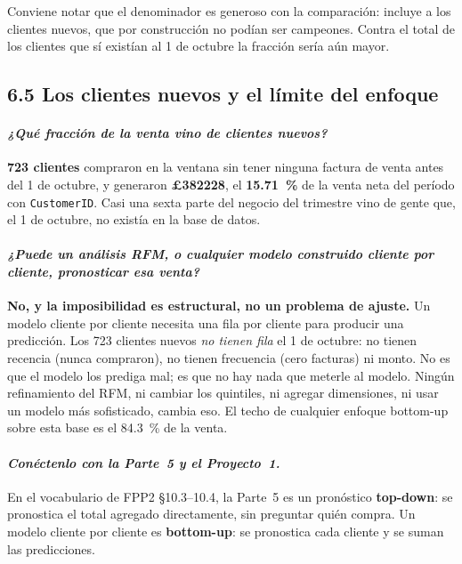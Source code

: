 \documentclass[11pt]{article}
\newcommand{\gbp}{\pounds}
\begin{document}
Conviene notar que el denominador es generoso con la comparaci\'on: incluye a
los clientes nuevos, que por construcci\'on no pod\'ian ser campeones. Contra
el total de los clientes que s\'i exist\'ian al 1 de octubre la fracci\'on
ser\'ia a\'un mayor.

\subsection{6.5 Los clientes nuevos y el l\'imite del enfoque}



\paragraph{{\normalfont\itshape ¿Qu\'e fracci\'on de la venta vino de
clientes nuevos?}} \textbf{\num{723} clientes} compraron en la ventana sin
tener ninguna factura de venta antes del 1 de octubre, y generaron
\textbf{\gbp\num{382228}}, el \textbf{\SI{15.71}{\percent}} de la venta neta
del per\'iodo con \texttt{CustomerID}. Casi una sexta parte del negocio del
trimestre vino de gente que, el 1 de octubre, no exist\'ia en la base de
datos.

\paragraph{{\normalfont\itshape ¿Puede un an\'alisis RFM, o cualquier modelo
construido cliente por cliente, pronosticar esa venta?}} \textbf{No, y la
imposibilidad es estructural, no un problema de ajuste.} Un modelo cliente
por cliente necesita una fila por cliente para producir una predicci\'on. Los
\num{723} clientes nuevos \emph{no tienen fila} el 1 de octubre: no tienen
recencia (nunca compraron), no tienen frecuencia (cero facturas) ni monto. No
es que el modelo los prediga mal; es que no hay nada que meterle al modelo.
Ning\'un refinamiento del RFM, ni cambiar los quintiles, ni agregar
dimensiones, ni usar un modelo m\'as sofisticado, cambia eso. El techo de
cualquier enfoque bottom-up sobre esta base es el \SI{84.3}{\percent} de la
venta.

\paragraph{{\normalfont\itshape Con\'ectenlo con la Parte~5 y el
Proyecto~1.}} En el vocabulario de FPP2 \S10.3--10.4, la Parte~5 es un
pron\'ostico \textbf{top-down}: se pronostica el total agregado directamente,
sin preguntar qui\'en compra. Un modelo cliente por cliente es
\textbf{bottom-up}: se pronostica cada cliente y se suman las predicciones.
\end{document}
